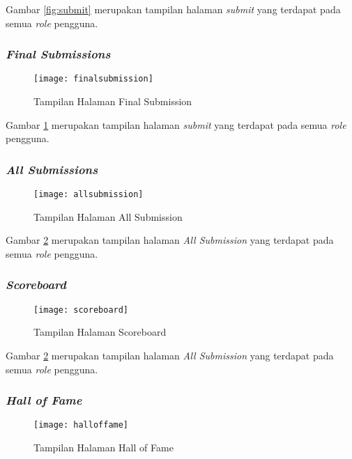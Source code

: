 Gambar \ref{fig:submit} merupakan tampilan halaman \textit{submit} yang terdapat pada semua \textit{role} pengguna.

\subsubsection{\textit{Final Submissions}}
\begin{figure}[H]
	\centering  
	\texttt{[image: finalsubmission]}  
	\caption[Tampilan Halaman \textit{Final Submission}]{Tampilan Halaman Final Submission} 
	\label{fig:finalsubmission} 
\end{figure}

Gambar \ref{fig:finalsubmission} merupakan tampilan halaman \textit{submit} yang terdapat pada semua \textit{role} pengguna.
\subsubsection{\textit{All Submissions}}
\begin{figure}[H]
	\centering  
	\texttt{[image: allsubmission]}  
	\caption[Tampilan Halaman \textit{All Submission}]{Tampilan Halaman All Submission} 
	\label{fig:allsubmission} 
\end{figure}

Gambar \ref{fig:allsubmission} merupakan tampilan halaman \textit{All Submission} yang terdapat pada semua \textit{role} pengguna.

\subsubsection{\textit{Scoreboard}}
\begin{figure}[H]
	\centering  
	\texttt{[image: scoreboard]}  
	\caption[Tampilan Halaman \textit{Scoreboard}]{Tampilan Halaman Scoreboard} 
	\label{fig:scoreboard} 
\end{figure}

Gambar \ref{fig:allsubmission} merupakan tampilan halaman \textit{All Submission} yang terdapat pada semua \textit{role} pengguna.

\subsubsection{\textit{Hall of Fame}}
\begin{figure}[H]
	\centering  
	\texttt{[image: halloffame]}  
	\caption[Tampilan Halaman \textit{Hall of Fame}]{Tampilan Halaman Hall of Fame} 
	\label{fig:halloffame} 
\end{figure}

